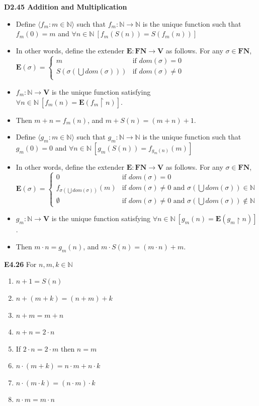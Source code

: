 \documentclass[10pt, landscape]{article}
\begin{document}
\begin{multicols*}{3}
\textbf{D2.45 Addition and Multiplication}
\begin{itemize}
    \item Define $\langle f_m : m \in \mathbb{N} \rangle$ such that $f_m: \mathbb{N} \rightarrow \mathbb{N}$ is the unique function such that $f_m(0)=m$ and $\forall n \in \mathbb{N} \ [f_m(S(n))=S(f_m(n))]$
    \item In other words, define the extender $\mathbf{E:FN\rightarrow V}$ as follows. For any $\sigma \in \mathbf{FN}$, $\mathbf{E}(\sigma) =
    \left\{
    \begin{array}{lr}
      m & \text{if $dom(\sigma)=0$} \\
      S(\sigma(\bigcup dom(\sigma))) & \text{if $dom(\sigma) \neq 0$} \\
    \end{array}
    \right.
    $
    \item $f_m:\mathbb{N}\rightarrow \mathbf{V}$ is the unique function satisfying $\forall n \in \mathbb{N} \ [f_m(n)=\mathbf{E}(f_m \restriction n)]$.
    \item Then $m+n=f_m(n)$, and $m + S(n) = (m+n)+1$.
    \item Define $\langle g_m : m \in \mathbb{N} \rangle$ such that $g_m: \mathbb{N} \rightarrow \mathbb{N}$ is the unique function such that $g_m(0)=0$ and $\forall n \in \mathbb{N} \ [g_m(S(n))=f_{g_m(n)}(m)]$
    \item In other words, define the extender $\mathbf{E:FN\rightarrow V}$ as follows. For any $\sigma \in \mathbf{FN}$, $\mathbf{E}(\sigma) =
    \left\{
    \begin{array}{lr}
      0 & \text{if $dom(\sigma)=0$} \\
      f_{\sigma(\bigcup dom(\sigma))}(m) & \text{if $dom(\sigma) \neq 0$ and $\sigma(\bigcup dom(\sigma)) \in \mathbb{N}$} \\
      \emptyset & \text{if $dom(\sigma) \neq 0$ and $\sigma(\bigcup dom(\sigma)) \notin \mathbb{N}$} 
    \end{array}
    \right.
    $
    \item $g_m:\mathbb{N}\rightarrow \mathbf{V}$ is the unique function satisfying $\forall n \in \mathbb{N} \ [g_m(n)=\mathbf{E}(g_m \restriction n)]$.
    \item Then $m\cdot n=g_m(n)$, and $m \cdot S(n)=(m \cdot n) + m$.
\end{itemize}

\textbf{E4.26} For $n,m,k \in \mathbb{N}$
\begin{enumerate}
    \item $n+1=S(n)$
    \item $n+(m+k)=(n+m)+k$
    \item $n+m=m+n$
    \item $n+n=2 \cdot n$
    \item If $2 \cdot n = 2 \cdot m$ then $n=m$
    \item $n \cdot (m+k)=n \cdot m + n \cdot k$
    \item $n \cdot (m \cdot k) = (n \cdot m) \cdot k$
    \item $n \cdot m = m \cdot n$
\end{enumerate}


\end{multicols*}
\end{document}
